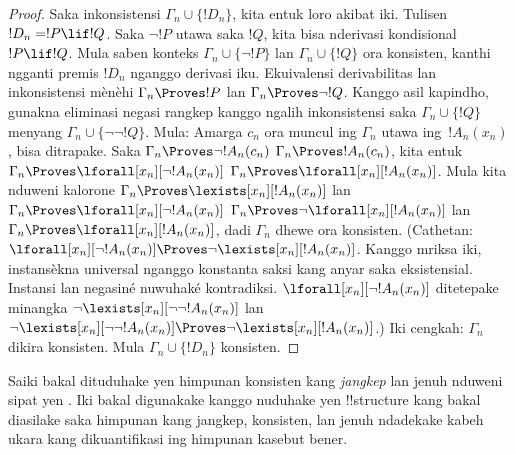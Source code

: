 \documentclass[../../../include/open-logic-section]{subfiles}
\begin{document}
\begin{proof}
Saka inkonsistensi $\Gamma_n\cup\{!D_n\}$, kita entuk loro akibat iki.
Tulisen $!D_n=!P\lif !Q$. Saka $\lnot !P$ utawa saka $!Q$,
kita bisa nderivasi kondisional $!P\lif !Q$. Mula saben konteks
$\Gamma_n\cup\{\lnot !P\}$ lan $\Gamma_n\cup\{!Q\}$ ora konsisten,
kanthi ngganti premis $!D_n$ nganggo derivasi iku.
Ekuivalensi derivabilitas lan inkonsistensi mènèhi
$\Gamma_n\Proves !P$ lan $\Gamma_n\Proves\lnot !Q$.
Kanggo asil kapindho, gunakna eliminasi negasi rangkep kanggo
ngalih inkonsistensi saka $\Gamma_n\cup\{!Q\}$ menyang
$\Gamma_n\cup\{\lnot\lnot !Q\}$.
Mula:
Amarga $c_n$ ora muncul ing
$\Gamma_n$ utawa ing~$!A_n(x_n)$,
 bisa ditrapake.
Saka 
{$\Gamma_n \Proves \lnot !A_n(c_n)$}
{$\Gamma_n \Proves !A_n(c_n)$},
kita entuk
{$\Gamma_n \Proves \lforall[x_n][\lnot !A_n(x_n)]$}
{$\Gamma_n \Proves \lforall[x_n][!A_n(x_n)]$}.
Mula kita nduweni kalorone
{$\Gamma_n \Proves \lexists[x_n][!A_n(x_n)]$ lan
$\Gamma_n \Proves \lforall[x_n][\lnot !A_n(x_n)]$}
{$\Gamma_n \Proves \lnot\lforall[x_n][!A_n(x_n)]$ lan
$\Gamma_n \Proves \lforall[x_n][!A_n(x_n)]$},
dadi $\Gamma_n$ dhewe ora konsisten.
{(Cathetan:
{$\lforall[x_n][\lnot !A_n(x_n)] \Proves
  \lnot\lexists[x_n][!A_n(x_n)]$. Kanggo mriksa iki,
  instansèkna universal nganggo konstanta saksi kang anyar saka
  eksistensial. Instansi lan negasiné nuwuhaké kontradiksi.
  }
{$\lforall[x_n][\lnot !A_n(x_n)]$ ditetepake minangka
  $\lnot\lexists[x_n][\lnot\lnot !A_n(x_n)]$ lan
  $\lnot\lexists[x_n][\lnot\lnot !A_n(x_n)] \Proves
  \lnot\lexists[x_n][!A_n(x_n)]$}.)}{}
Iki cengkah: $\Gamma_n$ dikira konsisten. Mula $\Gamma_n \cup \{
!D_n\}$ konsisten.
\end{proof}

\begin{explain}
Saiki bakal dituduhake yen himpunan konsisten kang \emph{jangkep} lan
jenuh nduweni sipat yen .
Iki bakal digunakake kanggo nuduhake yen !!{structure} kang bakal
diasilake saka himpunan kang jangkep, konsisten, lan jenuh ndadekake
kabeh ukara kang dikuantifikasi ing himpunan kasebut bener.
\end{explain}
\end{document}
